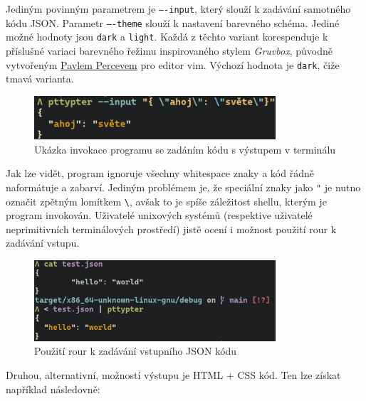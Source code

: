 \documentclass[11pt, letterpaper]{article}
\begin{document}
Jediným povinným parametrem je \texttt{----input}, který slouží k zadávání samotného kódu JSON. Parametr \texttt{----theme} slouží k nastavení barevného schéma. Jediné možné hodnoty jsou \texttt{dark} a \texttt{light}. Každá z těchto variant korespenduje k příslušné variaci barevného řežimu inspirovaného stylem \textit{Gruvbox}, původně vytvořeným \href{https://github.com/morhetz}{Pavlem Percevem} pro editor vim. Výchozí hodnota je \texttt{dark}, čiže tmavá varianta.
\begin{figure}[H]
    \begin{center}
        \includegraphics[width=0.8\textwidth]{term}
    \end{center}
    \caption{Ukázka invokace programu se zadáním kódu s výstupem v terminálu}
\end{figure}

Jak lze vidět, program ignoruje všechny whitespace znaky a kód řádně naformátuje a zabarví. Jediným problémem je, že speciální znaky jako \texttt{"} je nutno označit zpětným lomítkem \texttt{\textbackslash}, avšak to je spíše záležitost shellu, kterým je program invokován. 
Uživatelé unixových systémů (respektive uživatelé neprimitivních terminálových prostředí) jistě ocení i možnost použití rour k zadávání vstupu.
\begin{figure}[H]
    \begin{center}
        \includegraphics[width=0.8\textwidth]{term2}
    \end{center}
    \caption{Použití rour k zadávání vstupního JSON kódu}
\end{figure}

Druhou, alternativní, možností výstupu je HTML + CSS kód. Ten lze získat například následovně:
\end{document}
